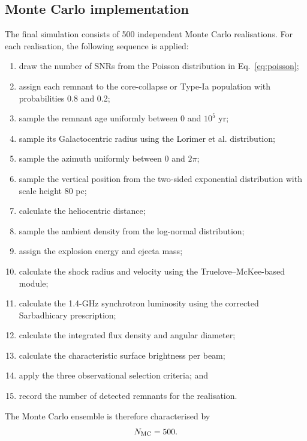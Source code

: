 \documentclass[
aps,
prd,
reprint,
superscriptaddress,
nofootinbib
]{revtex4-2}
\begin{document}
	\subsection{Monte Carlo implementation}
	
	The final simulation consists of 500 independent Monte Carlo realisations.
	For each realisation, the following sequence is applied:
	
	\begin{enumerate}
		\item draw the number of SNRs from the Poisson distribution in
		Eq.~\eqref{eq:poisson};
		\item assign each remnant to the core-collapse or Type-Ia population with
		probabilities 0.8 and 0.2;
		\item sample the remnant age uniformly between 0 and $10^5$ yr;
		\item sample its Galactocentric radius using the Lorimer et al. distribution;
		\item sample the azimuth uniformly between 0 and $2\pi$;
		\item sample the vertical position from the two-sided exponential
		distribution with scale height 80 pc;
		\item calculate the heliocentric distance;
		\item sample the ambient density from the log-normal distribution;
		\item assign the explosion energy and ejecta mass;
		\item calculate the shock radius and velocity using the
		Truelove--McKee-based module;
		\item calculate the 1.4-GHz synchrotron luminosity using the corrected
		Sarbadhicary prescription;
		\item calculate the integrated flux density and angular diameter;
		\item calculate the characteristic surface brightness per beam;
		\item apply the three observational selection criteria; and
		\item record the number of detected remnants for the realisation.
	\end{enumerate}
	
	The Monte Carlo ensemble is therefore characterised by
	\begin{equation}
		N_{\rm MC}=500.
		\label{eq:nmc}
	\end{equation}
	
\end{document}
